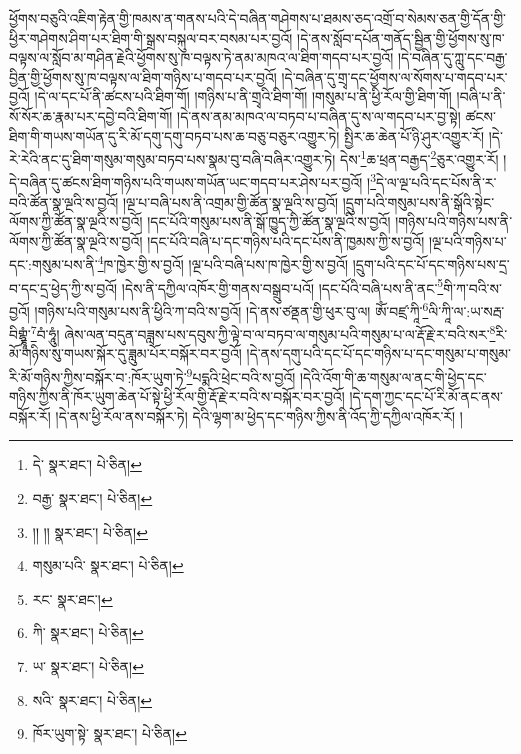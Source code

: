 ཕྱོགས་བཅུའི་འཇིག་རྟེན་གྱི་ཁམས་ན་གནས་པའི་དེ་བཞིན་གཤེགས་པ་ཐམས་ཅད་འགྲོ་བ་སེམས་ཅན་གྱི་དོན་གྱི་ཕྱིར་གཤེགས་ཤིག་པར་ཐིག་གི་སྒྲས་བསྐུལ་བར་བསམ་པར་བྱའོ། །དེ་ནས་སློབ་དཔོན་གནོད་སྦྱིན་གྱི་ཕྱོགས་སུ་ཁ་བལྟས་ལ་སློབ་མ་གཤིན་རྗེའི་ཕྱོགས་སུ་ཁ་བལྟས་ཏེ་ནམ་མཁའ་ལ་ཐིག་གདབ་པར་བྱའོ། །དེ་བཞིན་དུ་ཀླུ་དང་བརྒྱ་བྱིན་གྱི་ཕྱོགས་སུ་ཁ་བལྟས་ལ་ཐིག་གཉིས་པ་གདབ་པར་བྱའོ། །དེ་བཞིན་དུ་གྲྭ་དང་ཕྱོགས་ལ་སོགས་པ་གདབ་པར་བྱའོ། །དེ་ལ་དང་པོ་ནི་ཚངས་པའི་ཐིག་གོ། །གཉིས་པ་ནི་གྲྭའི་ཐིག་གོ། །གསུམ་པ་ནི་ཕྱི་རོལ་གྱི་ཐིག་གོ། །བཞི་པ་ནི་སོ་སོར་ཆ་རྣམ་པར་དབྱེ་བའི་ཐིག་གོ། །དེ་ནས་ནམ་མཁའ་ལ་བཏབ་པ་བཞིན་དུ་ས་ལ་གདབ་པར་བྱ་སྟེ། ཚངས་ཐིག་གི་གཡས་གཡོན་དུ་རི་མོ་དགུ་དགུ་བཏབ་པས་ཆ་བཅུ་བཅུར་འགྱུར་ཏེ། སྤྱིར་ཆ་ཆེན་པོ་ཉི་ཤུར་འགྱུར་རོ། །དེ་རེ་རེའི་ནང་དུ་ཐིག་གསུམ་གསུམ་བཏབ་པས་སྣམ་བུ་བཞི་བཞིར་འགྱུར་ཏེ། དེས་\footnote{དེ་  སྣར་ཐང་།  པེ་ཅིན། }ཆ་ཕྲན་བརྒྱད་\footnote{བརྒྱ་  སྣར་ཐང་།  པེ་ཅིན། }ཅུར་འགྱུར་རོ། །དེ་བཞིན་དུ་ཚངས་ཐིག་གཉིས་པའི་གཡས་གཡོན་ཡང་གདབ་པར་ཤེས་པར་བྱའོ། །\footnote{།། །།  སྣར་ཐང་།  པེ་ཅིན། }དེ་ལ་ལྔ་པའི་དང་པོས་ནི་ར་བའི་ཚོན་སྣ་ལྔའི་ས་བྱའོ། །ལྔ་པ་བཞི་པས་ནི་འགྲམ་གྱི་ཚོན་སྣ་ལྔའི་ས་བྱའོ། །དྲུག་པའི་གསུམ་པས་ནི་སྒོའི་སྟེང་ལོགས་ཀྱི་ཚོན་སྣ་ལྔའི་ས་བྱའོ། །དང་པོའི་གསུམ་པས་ནི་སྒོ་ཁྱུད་ཀྱི་ཚོན་སྣ་ལྔའི་ས་བྱའོ། །གཉིས་པའི་གཉིས་པས་ནི་ལོགས་ཀྱི་ཚོན་སྣ་ལྔའི་ས་བྱའོ། །དང་པོའི་བཞི་པ་དང་གཉིས་པའི་དང་པོས་ནི་ཁྱམས་ཀྱི་ས་བྱའོ། །ལྔ་པའི་གཉིས་པ་དང་:གསུམ་པས་ནི་\footnote{གསུམ་པའི་  སྣར་ཐང་།  པེ་ཅིན། }ཁ་ཁྱེར་གྱི་ས་བྱའོ། །ལྔ་པའི་བཞི་པས་ཁ་ཁྱེར་གྱི་ས་བྱའོ། །དྲུག་པའི་དང་པོ་དང་གཉིས་པས་དྲ་བ་དང་དྲ་ཕྱེད་ཀྱི་ས་བྱའོ། །དེས་ནི་དཀྱིལ་འཁོར་གྱི་གནས་བསྒྲུབ་པའོ། །དང་པོའི་བཞི་པས་ནི་ནང་\footnote{རང་  སྣར་ཐང་། }གི་ཀ་བའི་ས་བྱའོ། །གཉིས་པའི་གསུམ་པས་ནི་ཕྱིའི་ཀ་བའི་ས་བྱའོ། །དེ་ནས་ཙནྡན་གྱི་ཕུར་བུ་ལ། ཨོཾ་བཛྲ་ཀཱི་\footnote{ཀི་  སྣར་ཐང་།  པེ་ཅིན། }ལི་ཀཱི་ལ་:ཡ་སརྦ་བིགྷྣཱཾ་\footnote{ཡ་  སྣར་ཐང་།  པེ་ཅིན། }བཾ་ཧཱུཾ། ཞེས་ལན་བདུན་བཟླས་པས་དབུས་ཀྱི་ལྟེ་བ་ལ་བཏབ་ལ་གསུམ་པའི་གསུམ་པ་ལ་རྡོ་རྗེ་ར་བའི་སར་\footnote{སའི་  སྣར་ཐང་།  པེ་ཅིན། }རི་མོ་གཉིས་སུ་གཡས་སྐོར་དུ་ཟླུམ་པོར་བསྐོར་བར་བྱའོ། །དེ་ནས་དགུ་པའི་དང་པོ་དང་གཉིས་པ་དང་གསུམ་པ་གསུམ་རི་མོ་གཉིས་ཀྱིས་བསྐོར་བ་:ཁོར་ཡུག་ཏེ་\footnote{ཁོར་ཡུག་སྟེ་  སྣར་ཐང་།  པེ་ཅིན། }པདྨའི་ཕྲེང་བའི་ས་བྱའོ། །དེའི་འོག་གི་ཆ་གསུམ་ལ་ནང་གི་ཕྱེད་དང་གཉིས་ཀྱིས་ནི་ཁོར་ཡུག་ཆེན་པོ་སྟེ་ཕྱི་རོལ་གྱི་རྡོ་རྗེ་ར་བའི་ས་བསྐོར་བར་བྱའོ། །དེ་དག་ཀྱང་དང་པོ་རི་མོ་ནང་ནས་བསྐོར་རོ། །དེ་ནས་ཕྱི་རོལ་ནས་བསྐོར་ཏེ། དེའི་ལྷག་མ་ཕྱེད་དང་གཉིས་ཀྱིས་ནི་འོད་ཀྱི་དཀྱིལ་འཁོར་རོ། །
